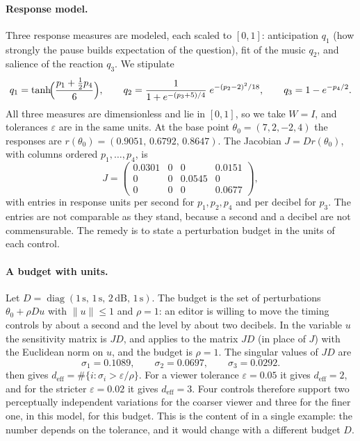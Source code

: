 \paragraph{Response model.} Three response measures are modeled, each scaled to $[0,1]$: anticipation $q_1$ (how strongly the pause builds expectation of the question), fit of the music $q_2$, and salience of the reaction $q_3$. We stipulate
\[
q_1=\tanh\!\Bigl(\frac{p_1+\tfrac12p_4}{6}\Bigr),\qquad
q_2=\frac{1}{1+e^{-(p_3+5)/4}}\;e^{-(p_2-2)^2/18},\qquad
q_3=1-e^{-p_4/2}.
\]
All three measures are dimensionless and lie in $[0,1]$, so we take $W=I$, and tolerances $\varepsilon$ are in the same units. At the base point $\theta_0=(7,2,-2,4)$ the responses are $r(\theta_0)=(0.9051,\,0.6792,\,0.8647)$. The Jacobian $J=Dr(\theta_0)$, with columns ordered $p_1,\dots,p_4$, is
\[
J=\begin{pmatrix}
0.0301 & 0 & 0 & 0.0151\\
0 & 0 & 0.0545 & 0\\
0 & 0 & 0 & 0.0677
\end{pmatrix},
\]
with entries in response units per second for $p_1,p_2,p_4$ and per decibel for $p_3$. The entries are not comparable as they stand, because a second and a decibel are not commensurable. The remedy is to state a perturbation budget in the units of each control.

\paragraph{A budget with units.} Let $D=\operatorname{diag}(1\,\mathrm{s},\,1\,\mathrm{s},\,2\,\mathrm{dB},\,1\,\mathrm{s})$. The budget is the set of perturbations $\theta_0+\rho Du$ with $\lVert u\rVert\le1$ and $\rho=1$: an editor is willing to move the timing controls by about a second and the level by about two decibels. In the variable $u$ the sensitivity matrix is $JD$, and  applies to the matrix $JD$ (in place of $J$) with the Euclidean norm on $u$, and the budget is $\rho=1$. The singular values of $JD$ are
\[
\sigma_1=0.1089,\qquad\sigma_2=0.0697,\qquad\sigma_3=0.0292 .
\]
 then gives $d_{\mathrm{eff}}=\#\{i:\sigma_i>\varepsilon/\rho\}$. For a viewer tolerance $\varepsilon=0.05$ it gives $d_{\mathrm{eff}}=2$, and for the stricter $\varepsilon=0.02$ it gives $d_{\mathrm{eff}}=3$. Four controls therefore support two perceptually independent variations for the coarser viewer and three for the finer one, in this model, for this budget. This is the content of  in a single example: the number depends on the tolerance, and it would change with a different budget $D$.

